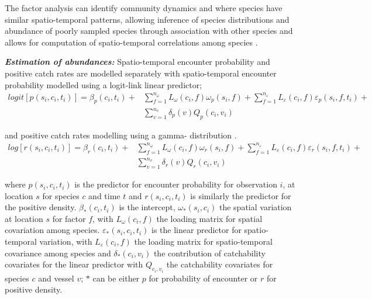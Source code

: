 \documentclass{nature}
\begin{document}
\begin{linenumbers}
The factor analysis can identify community dynamics and where species have
similar spatio-temporal patterns, allowing inference of species distributions
and abundance of poorly sampled species through association with other species
and allows for computation of spatio-temporal correlations among species
\cite{Thorson2016b}.

\textbf{\textit{Estimation of abundances:}} Spatio-temporal encounter
probability and positive catch rates are modelled separately with
spatio-temporal encounter probability modelled using a logit-link linear
predictor;
		\begin{equation}
			\begin{split}
			logit[p(s_{i},c_{i},t_{i})] =	\beta_{p}(c_{i},t_{i}) +
			& \sum\limits_{f=1}^{n_{\omega}} L_{\omega}(c_{i},f)
			\omega_{p}(s_{i},f) + \sum\limits_{f=1}^{n_{\varepsilon}}
			L_{\varepsilon}(c_{i},f) \varepsilon_{p}(s_{i},f,t_{i}) + \\ 
			& \sum\limits_{v=1}^{n_{v}}\delta_{p}(v)Q_{p}(c_{i}, v_{i})
		\end{split}
		\end{equation}

and positive catch rates modelling using a gamma- distribution \cite{Thorson2015a}. 
		\begin{equation}
			\begin{split}
			log[r(s_{i},c_{i},t_{i})] = \beta_{r}(c_{i},t_{i}) +
			& \sum\limits_{f=1}^{n_{\omega}} L_{\omega}(c_{i},f)
			\omega_{r}(s_{i},f) +\sum\limits_{f=1}^{n_{\varepsilon}} 
			L_{\varepsilon}(c_{i},f) \varepsilon_{r}(s_{i},f,t_{i}) + \\
			& \sum\limits_{v=1}^{n_{v}}\delta_{r}(v) Q_{r}(c_{i}, v_{i})
			\end{split}
		\end{equation}

where $p(s_{i}, c_{i}, t_{i})$ is the predictor for encounter probability for
observation $i$, at location $s$ for species $c$ and time $t$ and $r(s_{i},
c_{i}, t_{i})$ is similarly the predictor for the positive density.
$\beta_{*}(c_{i},t_{i})$ is the intercept, $\omega_{*}(s_{i},c_{i})$ the
spatial variation at location $s$ for factor $f$, with $L_{\omega}(c_{i},f)$
the loading matrix for spatial covariation among species.
$\varepsilon_{*}(s_{i},c_{i},t_{i})$ is the linear predictor for
spatio-temporal variation, with $L_{\varepsilon}(c_{i}, f)$ the loading matrix
for spatio-temporal covariance among species and $\delta_{*}(c_{i}, v_{i})$ the
contribution of catchability covariates for the linear predictor with
$Q_{c_{i}, v_{i}}$ the catchability covariates for species $c$ and vessel $v$;
$*$ can be either $p$ for probability of encounter or $r$ for positive density.


\end{linenumbers}
\end{document}
